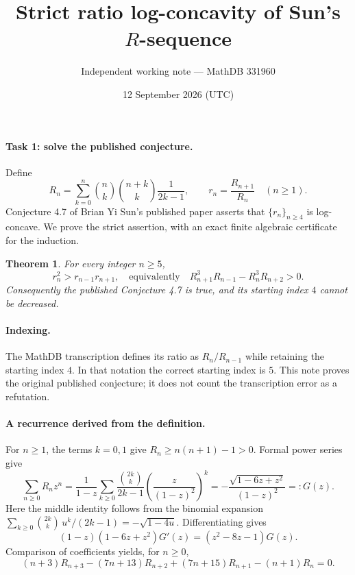 \documentclass[11pt]{article}
\title{Strict ratio log-concavity of Sun's \(R\)-sequence}
\author{Independent working note --- MathDB 331960}
\date{12 September 2026 (UTC)}
\newtheorem{theorem}{Theorem}
\begin{document}
\maketitle

\paragraph{Task 1: solve the published conjecture.}
Define
\[
 R_n=\sum_{k=0}^n\binom nk\binom{n+k}k\frac1{2k-1},
 \qquad r_n=\frac{R_{n+1}}{R_n}\quad(n\ge1).
\]
Conjecture 4.7 of Brian Yi Sun's published paper \cite{sun} asserts that
\(\{r_n\}_{n\ge4}\) is log-concave. We prove the strict assertion, with
an exact finite algebraic certificate for the induction.

\begin{theorem}\label{main}
For every integer \(n\ge5\),
\[
 r_n^2>r_{n-1}r_{n+1},
 \quad\text{equivalently}\quad
 R_{n+1}^3R_{n-1}-R_n^3R_{n+2}>0.
\]
Consequently the published Conjecture 4.7 is true, and its starting
index \(4\) cannot be decreased.
\end{theorem}

\paragraph{Indexing.}
The MathDB transcription defines its ratio as \(R_n/R_{n-1}\) while
retaining the starting index \(4\). In that notation the correct
starting index is \(5\). This note proves the original published
conjecture; it does not count the transcription error as a refutation.

\paragraph{A recurrence derived from the definition.}
For \(n\ge1\), the terms \(k=0,1\) give \(R_n\ge n(n+1)-1>0\).
Formal power series give
\[
 \sum_{n\ge0}R_nz^n
 =\frac1{1-z}\sum_{k\ge0}\frac{\binom{2k}k}{2k-1}
                  \left(\frac{z}{(1-z)^2}\right)^k
 =-\frac{\sqrt{1-6z+z^2}}{(1-z)^2}=:G(z).
\]
Here the middle identity follows from the binomial expansion
\(\sum_{k\ge0}\binom{2k}k\,u^k/(2k-1)=-\sqrt{1-4u}\).
Differentiating gives
\[
 (1-z)(1-6z+z^2)G'(z)=(z^2-8z-1)G(z).
\]
Comparison of coefficients yields, for \(n\ge0\),
\begin{equation}\label{rec}
 (n+3)R_{n+3}-(7n+13)R_{n+2}
       +(7n+15)R_{n+1}-(n+1)R_n=0.
\end{equation}
\end{document}
